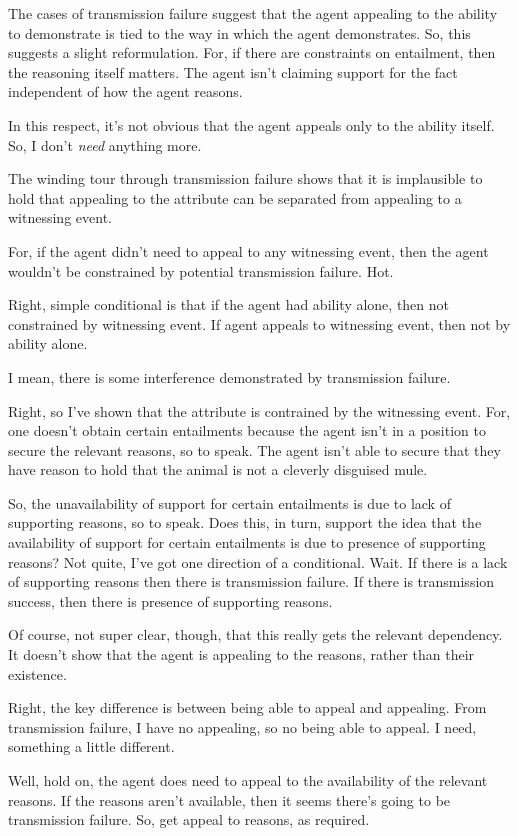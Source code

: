 \documentclass[10pt]{article}
\begin{document}
\begin{note}
  The cases of transmission failure suggest that the agent appealing to the ability to demonstrate is tied to the way in which the agent demonstrates.
  So, this suggests a slight reformulation.
  For, if there are constraints on entailment, then the reasoning itself matters.
  The agent isn't claiming support for the fact independent of how the agent reasons.

  In this respect, it's not obvious that the agent appeals only to the ability itself.
  So, I don't \emph{need} anything more.

  The winding tour through transmission failure shows that it is implausible to hold that appealing to the attribute can be separated from appealing to a witnessing event.

  For, if the agent didn't need to appeal to any witnessing event, then the agent wouldn't be constrained by potential transmission failure.
  Hot.

  Right, simple conditional is that if the agent had ability alone, then not constrained by witnessing event.
  If agent appeals to witnessing event, then not by ability alone.

  I mean, there is some interference demonstrated by transmission failure.

  Right, so I've shown that the attribute is contrained by the witnessing event.
  For, one doesn't obtain certain entailments because the agent isn't in a position to secure the relevant reasons, so to speak.
  The agent isn't able to secure that they have reason to hold that the animal is not a cleverly disguised mule.

  So, the unavailability of support for certain entailments is due to lack of supporting reasons, so to speak.
  Does this, in turn, support the idea that the availability of support for certain entailments is due to presence of supporting reasons?
  Not quite, I've got one direction of a conditional.
  Wait.
  If there is a lack of supporting reasons then there is transmission failure.
  If there is transmission success, then there is presence of supporting reasons.

  Of course, not super clear, though, that this really gets the relevant dependency.
  It doesn't show that the agent is appealing to the reasons, rather than their existence.

  Right, the key difference is between being able to appeal and appealing.
  From transmission failure, I have no appealing, so no being able to appeal.
  I need, something a little different.

  Well, hold on, the agent does need to appeal to the availability of the relevant reasons.
  If the reasons aren't available, then it seems there's going to be transmission failure.
  So, get appeal to reasons, as required.
\end{note}
\end{document}
